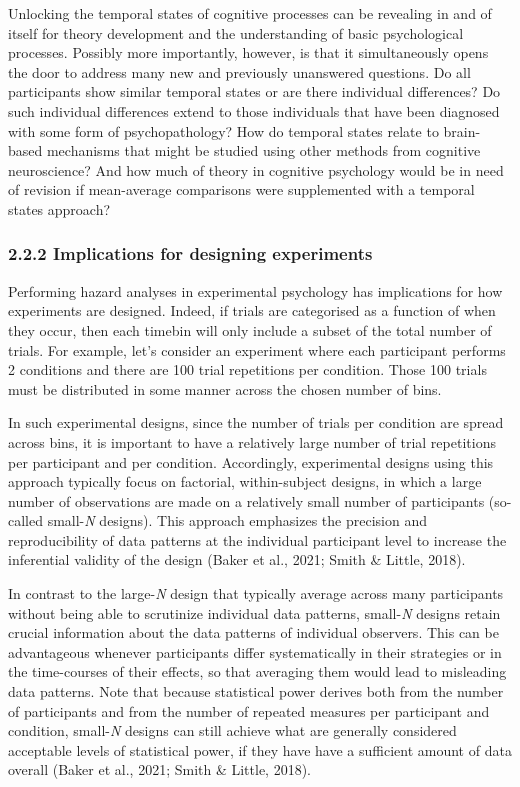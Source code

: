 \documentclass[
  man,floatsintext]{apa6}
\begin{document}
Unlocking the temporal states of cognitive processes can be revealing in and of itself for theory development and the understanding of basic psychological processes. Possibly more importantly, however, is that it simultaneously opens the door to address many new and previously unanswered questions. Do all participants show similar temporal states or are there individual differences? Do such individual differences extend to those individuals that have been diagnosed with some form of psychopathology? How do temporal states relate to brain-based mechanisms that might be studied using other methods from cognitive neuroscience? And how much of theory in cognitive psychology would be in need of revision if mean-average comparisons were supplemented with a temporal states approach?

\subsubsection{2.2.2 Implications for designing experiments}\label{implications-for-designing-experiments}

Performing hazard analyses in experimental psychology has implications for how experiments are designed. Indeed, if trials are categorised as a function of when they occur, then each timebin will only include a subset of the total number of trials. For example, let's consider an experiment where each participant performs 2 conditions and there are 100 trial repetitions per condition. Those 100 trials must be distributed in some manner across the chosen number of bins.

In such experimental designs, since the number of trials per condition are spread across bins, it is important to have a relatively large number of trial repetitions per participant and per condition. Accordingly, experimental designs using this approach typically focus on factorial, within-subject designs, in which a large number of observations are made on a relatively small number of participants (so-called small-\emph{N} designs). This approach emphasizes the precision and reproducibility of data patterns at the individual participant level to increase the inferential validity of the design (Baker et al., 2021; Smith \& Little, 2018).

In contrast to the large-\emph{N} design that typically average across many participants without being able to scrutinize individual data patterns, small-\emph{N} designs retain crucial information about the data patterns of individual observers. This can be advantageous whenever participants differ systematically in their strategies or in the time-courses of their effects, so that averaging them would lead to misleading data patterns. Note that because statistical power derives both from the number of participants and from the number of repeated measures per participant and condition, small-\emph{N} designs can still achieve what are generally considered acceptable levels of statistical power, if they have have a sufficient amount of data overall (Baker et al., 2021; Smith \& Little, 2018).
\end{document}
